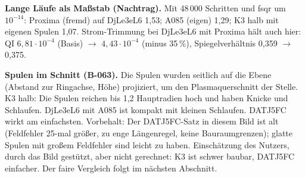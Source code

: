 \textbf{Lange Läufe als Maßstab (Nachtrag).} Mit 48\,000 Schritten und fsqr um $10^{-14}$: Proxima (fremd) auf DjLe3eL6 1,53; A085 (eigen) 1,29; K3 halb mit eigenen Spulen 1,07. Strom-Trimmung bei DjLe3eL6 mit Proxima hält auch hier: QI $6{,}81\cdot10^{-4}$ (Basis) $\to$ $4{,}43\cdot10^{-4}$ (minus 35\,\%), Spiegelverhältnis 0,359 $\to$ 0,375.

\textbf{Spulen im Schnitt (B-063).} Die Spulen wurden seitlich auf die Ebene (Abstand zur Ringachse, Höhe) projiziert, um den Plasmaquerschnitt der Stelle.
K3 halb: Die Spulen reichen bis 1,2 Hauptradien hoch und haben Knicke und Schlaufen. DjLe3eL6 mit A085 ist kompakt mit kleinen Schlaufen. DATJ5FC wirkt am einfachsten. Vorbehalt: Der DATJ5FC-Satz in diesem Bild ist alt (Feldfehler 25-mal größer, zu enge Längenregel, keine Bauraumgrenzen); glatte Spulen mit großem Feldfehler sind leicht zu haben.
Einschätzung des Nutzers, durch das Bild gestützt, aber nicht gerechnet: K3 ist schwer baubar, DATJ5FC einfacher. Der faire Vergleich folgt im nächsten Abschnitt.

